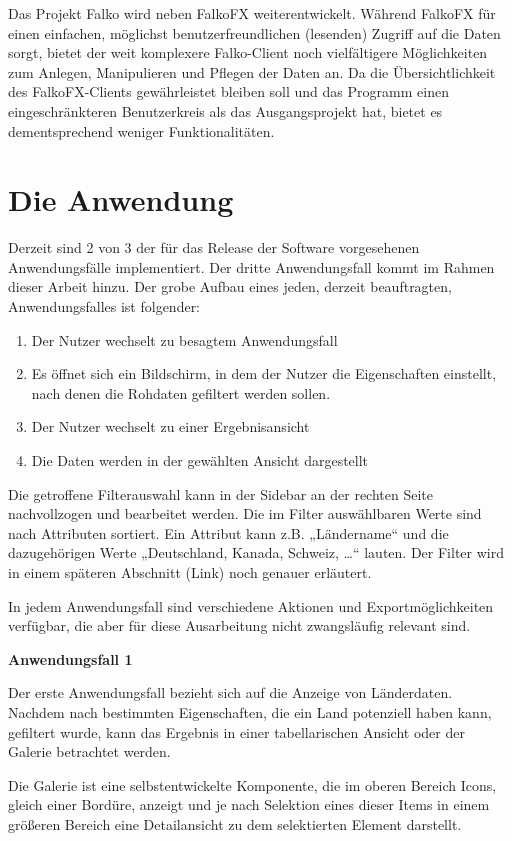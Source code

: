 Das Projekt Falko wird neben FalkoFX weiterentwickelt. Während FalkoFX für einen einfachen, möglichst benutzerfreundlichen (lesenden) Zugriff auf die Daten sorgt, bietet der weit komplexere Falko-Client noch vielfältigere Möglichkeiten zum Anlegen, Manipulieren und Pflegen der Daten an. Da die Übersichtlichkeit des FalkoFX-Clients gewährleistet bleiben soll und das Programm einen eingeschränkteren Benutzerkreis als das Ausgangsprojekt hat, bietet es dementsprechend weniger Funktionalitäten.
\section{Die Anwendung} \label{sec:grundAnwendung}
Derzeit sind 2 von 3 der für das Release der Software vorgesehenen Anwendungsfälle implementiert. Der dritte Anwendungsfall kommt im Rahmen dieser Arbeit hinzu.
Der grobe Aufbau eines jeden, derzeit beauftragten, Anwendungsfalles ist folgender:

\begin{enumerate}
	\item Der Nutzer wechselt zu besagtem Anwendungsfall
	\item Es öffnet sich ein Bildschirm, in dem der Nutzer die Eigenschaften einstellt, nach denen die Rohdaten gefiltert werden sollen.
	\item Der Nutzer wechselt zu einer Ergebnisansicht
	\item Die Daten werden in der gewählten Ansicht dargestellt
\end{enumerate}

Die getroffene Filterauswahl kann in der Sidebar an der rechten Seite nachvollzogen und bearbeitet werden. Die im Filter auswählbaren Werte sind nach Attributen sortiert. Ein Attribut kann z.B. „Ländername“ und die dazugehörigen Werte „Deutschland, Kanada, Schweiz, …“ lauten. Der Filter wird in einem späteren Abschnitt (Link) noch genauer erläutert.

In jedem Anwendungsfall sind verschiedene Aktionen und Exportmöglichkeiten verfügbar, die aber für diese Ausarbeitung nicht zwangsläufig relevant sind.

\textbf{Anwendungsfall 1}

Der erste Anwendungsfall bezieht sich auf die Anzeige von Länderdaten. Nachdem nach bestimmten Eigenschaften, die ein Land potenziell haben kann, gefiltert wurde, kann das Ergebnis in einer tabellarischen Ansicht oder der Galerie betrachtet werden.

Die Galerie ist eine selbstentwickelte Komponente, die im oberen Bereich Icons, gleich einer Bordüre, anzeigt und je nach Selektion eines dieser Items in einem größeren Bereich eine Detailansicht zu dem selektierten Element darstellt.

